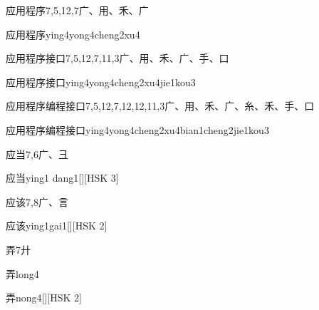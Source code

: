 \begin{entry}{应用程序}{7,5,12,7}{⼴、⽤、⽲、⼴}
  \begin{phonetics}{应用程序}{ying4yong4cheng2xu4}
  \end{phonetics}
\end{entry}

\begin{entry}{应用程序接口}{7,5,12,7,11,3}{⼴、⽤、⽲、⼴、⼿、⼝}
  \begin{phonetics}{应用程序接口}{ying4yong4cheng2xu4jie1kou3}
  \end{phonetics}
\end{entry}

\begin{entry*}{应用程序编程接口}{7,5,12,7,12,12,11,3}{⼴、⽤、⽲、⼴、⽷、⽲、⼿、⼝}
  \begin{phonetics}{应用程序编程接口}{ying4yong4cheng2xu4bian1cheng2jie1kou3}
  \end{phonetics}
\end{entry*}

\begin{entry}{应当}{7,6}{⼴、⼹}
  \begin{phonetics}{应当}{ying1 dang1}[][HSK 3]
  \end{phonetics}
\end{entry}

\begin{entry}{应该}{7,8}{⼴、⾔}
  \begin{phonetics}{应该}{ying1gai1}[][HSK 2]
  \end{phonetics}
\end{entry}

\begin{entry}{弄}{7}{⼶}
  \begin{phonetics}{弄}{long4}
  \end{phonetics}
  \begin{phonetics}{弄}{nong4}[][HSK 2]
  \end{phonetics}
\end{entry}

